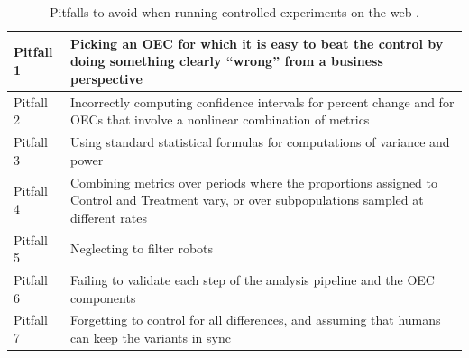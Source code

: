 \documentclass[english, grading]{tktltiki2}
\theoremstyle{definition}
\theoremstyle{remark}
\begin{document}
\begin{center}
\begin{table}[!h]
    \begin{tabular}{ | p{2cm} | p{10cm} |}
    \hline
	Pitfall 1 & Picking an OEC for which it is easy to beat the control by doing something clearly “wrong” from a business perspective \\ \hline
	Pitfall 2 & Incorrectly computing confidence intervals for percent change and for OECs that involve a nonlinear combination of metrics \\ \hline
	Pitfall 3 & Using standard statistical formulas for computations of variance and power \\ \hline
	Pitfall 4 & Combining metrics over periods where the proportions assigned to Control and Treatment vary, or over subpopulations sampled at different rates \\ \hline
	Pitfall 5 & Neglecting to filter robots \\ \hline
	Pitfall 6 & Failing to validate each step of the analysis pipeline and the OEC components \\ \hline
	Pitfall 7 & Forgetting to control for all differences, and assuming that humans can keep the variants in sync \\ \hline
    \end{tabular}
    \caption{Pitfalls to avoid when running controlled experiments on the web \cite{crook2009seven}.}
    \end{table}
\end{center}

\end{document}
